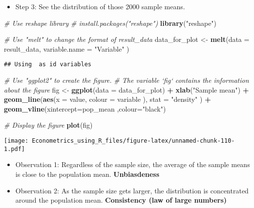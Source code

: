 \documentclass[]{book}
\newenvironment{Shaded}{\begin{snugshade}}{\end{snugshade}}
\newcommand{\CommentTok}[1]{\textcolor[rgb]{0.56,0.35,0.01}{\textit{#1}}}
\newcommand{\DataTypeTok}[1]{\textcolor[rgb]{0.13,0.29,0.53}{#1}}
\newcommand{\KeywordTok}[1]{\textcolor[rgb]{0.13,0.29,0.53}{\textbf{#1}}}
\newcommand{\NormalTok}[1]{#1}
\newcommand{\OperatorTok}[1]{\textcolor[rgb]{0.81,0.36,0.00}{\textbf{#1}}}
\newcommand{\StringTok}[1]{\textcolor[rgb]{0.31,0.60,0.02}{#1}}
\providecommand{\tightlist}{%
  \setlength{\itemsep}{0pt}\setlength{\parskip}{0pt}}
\begin{document}
\begin{itemize}
\tightlist
\item
  Step 3: See the distribution of those 2000 sample means.
\end{itemize}

\begin{Shaded}
\begin{Highlighting}[]
\CommentTok{# Use reshape library}
\CommentTok{# install.packages("reshape")}
\KeywordTok{library}\NormalTok{(}\StringTok{"reshape"}\NormalTok{)}

\CommentTok{# Use "melt" to change the format of result_data}
\NormalTok{data_for_plot <-}\StringTok{ }\KeywordTok{melt}\NormalTok{(}\DataTypeTok{data =}\NormalTok{ result_data, }\DataTypeTok{variable.name =} \StringTok{"Variable"}\NormalTok{ )}
\end{Highlighting}
\end{Shaded}

\begin{verbatim}
## Using  as id variables
\end{verbatim}

\begin{Shaded}
\begin{Highlighting}[]
\CommentTok{# Use "ggplot2" to create the figure.}
\CommentTok{# The variable `fig` contains the information about the figure}
\NormalTok{fig <-}\StringTok{ }
\StringTok{  }\KeywordTok{ggplot}\NormalTok{(}\DataTypeTok{data =}\NormalTok{ data_for_plot) }\OperatorTok{+}
\StringTok{  }\KeywordTok{xlab}\NormalTok{(}\StringTok{"Sample mean"}\NormalTok{) }\OperatorTok{+}\StringTok{ }
\StringTok{  }\KeywordTok{geom_line}\NormalTok{(}\KeywordTok{aes}\NormalTok{(}\DataTypeTok{x =}\NormalTok{ value, }\DataTypeTok{colour =}\NormalTok{ variable ),   }\DataTypeTok{stat =} \StringTok{"density"}\NormalTok{ ) }\OperatorTok{+}\StringTok{ }
\StringTok{  }\KeywordTok{geom_vline}\NormalTok{(}\DataTypeTok{xintercept=}\NormalTok{pop_mean ,}\DataTypeTok{colour=}\StringTok{"black"}\NormalTok{)}

\CommentTok{# Display the figure }
\KeywordTok{plot}\NormalTok{(fig)}
\end{Highlighting}
\end{Shaded}

\texttt{[image: Econometrics\_using\_R\_files/figure-latex/unnamed-chunk-110-1.pdf]}

\begin{itemize}
\tightlist
\item
  Observation 1: Regardless of the sample size, the average of the sample means is close to the population mean. \textbf{Unbiasdeness}
\item
  Observation 2: As the sample size gets larger, the distribution is concentrated around the population mean. \textbf{Consistency (law of large numbers)}
\end{itemize}
\end{document}
